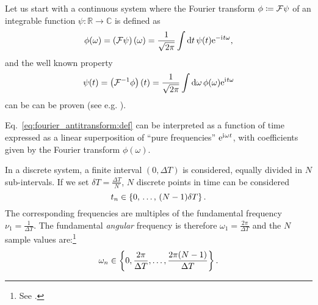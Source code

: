Let us start with a continuous system where the Fourier transform $\phi \coloneqq \mathcal{F}\psi$ of
an integrable function $\psi: \mathbb{R} \to \mathbb{C}$ is defined as
\begin{equation}\label{eq:fourier_transform:def}
  \phi(\omega) = \left(\mathcal{F}\psi\right) (\omega) =
    \frac{1}{\sqrt{2\pi}} \int \dd{t} \psi(t) \mathrm{e}^{- \mathrm{i}\mkern1mu t \omega} \text{,} 
\end{equation}
and the well known  property
\begin{equation}\label{eq:fourier_antitransform:def}
  \psi(t) = \left(\mathcal{F}^{-1} \phi \right) (t) =
    \frac{1}{\sqrt{2\pi}} \int \dd{\omega} \phi(\omega) \mathrm{e}^{\mathrm{i}\mkern1mu t \omega} 
\end{equation}
can be can be proven (see e.g. \cite{Folland:Fourier}).

Eq.~\eqref{eq:fourier_antitransform:def} can be interpreted
as a function of time
expressed as a linear superposition
of ``pure frequencies'' $\mathrm{e}^{\mathrm{i}\mkern1mu \omega t}$,
with coefficients given by the Fourier transform $\phi(\omega)$.

In a discrete system, a finite interval $(0, \Delta{T})$ is considered,
equally divided in $N$ sub-intervals. If we set $\delta{T} = \frac{\Delta{T}}{N}$,
$N$ discrete points in time can be considered
\begin{equation}
  t_n \in \left\{0,\,\hdots,\,(N-1)\delta{T}\right\} \text{.}
\end{equation} 
%
The corresponding frequencies are multiples of the fundamental frequency $\nu_1 = \frac{1}{\Delta{T}}$.
The fundamental \emph{angular} frequency is therefore $\omega_1 = \frac{2\pi}{\Delta{T}}$ and the
$N$ sample values are:\footnote{
  See
  \cite[Ch. ``The Discrete Fourier Transform'']{Oppenheim:Int3}.
}
\begin{equation}
  \omega_n \in \left\{0, \frac{2\pi}{\Delta{T}}, \dots, \frac{2\pi(N-1)}{\Delta{T}}\right\} \text{.}
\end{equation} 




